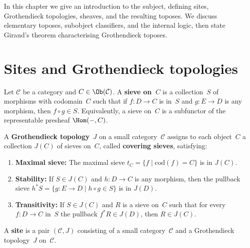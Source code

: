 In this chapter we give an introduction to the subject, defining sites,
Grothendieck topologies, sheaves, and the resulting toposes.
We discuss elementary toposes, subobject classifiers, and the internal
logic, then state Giraud's theorem characterising Grothendieck toposes.


\section{Sites and Grothendieck topologies}\label{sec:sites}


\begin{definition}[Sieve]\label{def:sieve}
Let $\mathcal{C}$ be a category and $C\in\Ob(\mathcal{C})$.
A \textbf{sieve on~$C$} is a collection~$S$ of morphisms with
codomain~$C$ such that if $f\colon D\to C$ is in~$S$ and
$g\colon E\to D$ is any morphism, then $f\circ g\in S$.
Equivalently, a sieve on~$C$ is a subfunctor of the representable
presheaf $\Hom(-,C)$.
\end{definition}

\begin{definition}\label{def:grothendieck-topology}
A \textbf{Grothendieck topology}~$J$ on a small category~$\mathcal{C}$
assigns to each object~$C$ a collection $J(C)$ of sieves on~$C$, called
\textbf{covering sieves}, satisfying:
\begin{enumerate}[label=(\roman*)]
\item \textbf{Maximal sieve:} The maximal sieve
      $t_C = \{f \mid \mathrm{cod}(f) = C\}$ is in $J(C)$.
\item \textbf{Stability:} If $S\in J(C)$ and $h\colon D\to C$ is any
      morphism, then the pullback sieve
      $h^*S = \{g\colon E\to D \mid h\circ g\in S\}$ is in $J(D)$.
\item \textbf{Transitivity:} If $S\in J(C)$ and $R$ is a sieve on~$C$
      such that for every $f\colon D\to C$ in~$S$ the pullback
      $f^*R\in J(D)$, then $R\in J(C)$.
\end{enumerate}
\end{definition}

\begin{definition}[Site]\label{def:site}
A \textbf{site} is a pair $(\mathcal{C}, J)$ consisting of a small
category~$\mathcal{C}$ and a Grothendieck topology~$J$ on~$\mathcal{C}$.
\end{definition}

